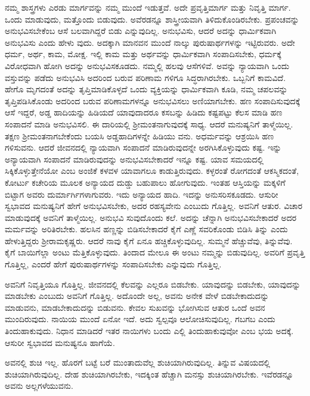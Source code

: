 ನಮ್ಮ ಶಾಸ್ತ್ರಗಳು ಎರಡು ಮಾರ್ಗವನ್ನು ನಮ್ಮ ಮುಂದೆ ಇಡುತ್ತವೆ. ಅದೇ ಪ್ರವೃತ್ತಿಮಾರ್ಗ ಮತ್ತು ನಿವೃತ್ತಿ ಮಾರ್ಗ. ಒಂದು ಮಾಡುವುದು, ಮತ್ತೊಂದು ಬಿಡುವುದು. ಅವೆರಡನ್ನೂ ಶಾಸ್ತ್ರೀಯವಾಗಿ ತಿಳಿದುಕೊಂಡಿರಬೇಕು. ಪ್ರಪಂಚವನ್ನು ಅನುಭವಿಸಬೇಕೆಂಬ ಆಸೆ ಬಲವಾಗಿದ್ದರೆ ಬಿಡು ಎನ್ನುವುದಿಲ್ಲ. ಅನುಭವಿಸು, ಆದರೆ ಅದನ್ನು ಧಾರ್ಮಿಕವಾಗಿ ಅನುಭವಿಸು ಎಂದು ಹೇಳು ವುದು. ಅದಕ್ಕಾಗಿ ಮಾನವನ ಮುಂದೆ ನಾಲ್ಕು ಪುರುಷಾರ್ಥಗಳನ್ನು ಇಟ್ಟಿರುವರು. ಅದೇ ಧರ್ಮ, ಅರ್ಥ, ಕಾಮ, ಮೋಕ್ಷ. ಇಲ್ಲಿ ಕಾಮ ಮತ್ತು ಅರ್ಥವನ್ನು ಧಾರ್ಮಿಕವಾಗಿ ಸಂಪಾದಿಸಬೇಕು, ಧರ್ಮಕ್ಕೆ ವಿರೋಧವಾಗಿ ಹೋಗಿ ಅದನ್ನು ಅನುಭವಿಸಕೂಡದು. ನಮ್ಮಲ್ಲಿ ಹಲವು ಆಸೆಗಳಿವೆ. ಅವನ್ನು ನ್ಯಾಯವಾಗಿ ಒಂದು ವಸ್ತುವನ್ನು ಪಡೆದು ಅನುಭವಿಸಿ ಅದರಿಂದ ಬರುವ ಪರಿಣಾಮ ಗಳಿಗೂ ಸಿದ್ಧರಾಗಿರಬೇಕು. ಒಬ್ಬನಿಗೆ ಕಾಮವಿದೆ. ಹೇಗೊ ಮೃಗದಂತೆ ಅದನ್ನು ತೃಪ್ತಿಮಾಡಿಕೊಳ್ಳದೆ ಒಂದು ವ್ಯಕ್ತಿಯನ್ನು ಧಾರ್ಮಿಕವಾಗಿ ಕೂಡಿ, ನಮ್ಮ ಚಪಲವನ್ನು ತೃಪ್ತಿಪಡಿಸಿಕೊಂಡು ಅದರಿಂದ ಬರುವ ಪರಿಣಾಮಗಳನ್ನೂ ಅನುಭವಿಸಲು ಅಣಿಯಾಗಬೇಕು. ಹಣ ಸಂಪಾದಿಸುವುದಕ್ಕೆ ಆಸೆ ಇದ್ದರೆ, ಅಡ್ಡ ಹಾದಿಯನ್ನು ಹಿಡಿಯದೆ ಯಾವುದಾದರೂ ಕಸಬನ್ನು ಹಿಡಿದು ಕಷ್ಟಪಟ್ಟು ಕೆಲಸ ಮಾಡಿ ಹಣ ಸಂಪಾದನೆ ಮಾಡಿ ಅನುಭವಿಸಲಿ. ಈ ದಾರಿಯಲ್ಲಿ ಶ‍್ರೀಮಂತನಾಗುವುದಕ್ಕೆ ಸಾಧ್ಯ. ಆದರೆ ಮನುಷ್ಯನಿಗೆ ತಾಳ್ಮೆಯಿಲ್ಲ. ತಕ್ಷಣ ಶ‍್ರೀಮಂತನಾಗಬೇಕೆಂದು ಬಯಸಿ ಅಡ್ಡಹಾದಿಗಳನ್ನೇ ಹಿಡಿಯು ವನು. ಅಧರ್ಮವನ್ನು ಆಶ್ರಯಿಸಿ ಹಣ ಗಳಿಸುವನು. ಆದರೆ ಜೀವನದಲ್ಲಿ ನ್ಯಾಯವಾಗಿ ಸಂಪಾದನೆ ಮಾಡಿರುವುದನ್ನೇ ಅರಗಿಸಿಕೊಳ್ಳುವುದು ಕಷ್ಟ. ಇನ್ನು ಅನ್ಯಾಯವಾಗಿ ಸಂಪಾದನೆ ಮಾಡಿರುವುದನ್ನು ಅನುಭವಿಸಬೇಕಾದರೆ ಇನ್ನೂ ಕಷ್ಟ. ಯಾವ ಸಮಯದಲ್ಲಿ ಸಿಕ್ಕಿಕೊಳ್ಳುತ್ತೇನೆಯೋ ಎಂಬ ಅಂಜಿಕೆ ಕಳವಳ ಯಾವಾಗಲೂ ಕಾಡುತ್ತಿರುವುದು. ಕಳ್ಳರಂತೆ ರೋಗದಂತೆ ಆಕಸ್ಮಿಕದಂತೆ, ಕೋರ್ಟು ಕಚೇರಿಯ ಮೂಲಕ ಅನ್ಯಾಯದ ದುಡ್ಡು ಬಹುಪಾಲು ಹೋಗುವುದು. ಇಂತಹ ಆಸ್ತಿಯನ್ನು ಮಕ್ಕಳಿಗೆ ಬಿಟ್ಟಾಗ ಅವರು ದುರ್ಮಾರ್ಗಿಗಳಾಗುವರು. ಇದು ಅನ್ಯಾಯದ ಹಾದಿ. ಇದನ್ನು ಅನುಸರಿಸಕೂಡದು. ಆಸುರೀ ಸ್ವಭಾವದ ಮನುಷ್ಯನಿಗೆ ಹೇಗೆ ಅನುಭವಿಸಬೇಕು, ಅದರ ರಹಸ್ಯವೇನು ಎಂಬುದು ಗೊತ್ತಿಲ್ಲ. ಅವನಿಗೆ ಆತುರ. ವಿಚಾರ ಮಾಡುವುದಕ್ಕೆ ಅವನಿಗೆ ತಾಳ್ಮೆಯಿಲ್ಲ. ಅನುಭವಿ ಸುವುದೊಂದು ಕಲೆ. ಅದನ್ನು ಚೆನ್ನಾಗಿ ಅನುಭವಿಸಬೇಕಾದರೆ ಅದರ ಮರ್ಮವನ್ನು ಅರಿತಿರಬೇಕು. ಹಲಸಿನ ಹಣ್ಣನ್ನು ಬಿಡಿಸಬೇಕಾದರೆ ಕೈಗೆ ಎಣ್ಣೆ ಸವರಿಕೊಂಡು ಬಿಡಿಸಿ ತಿನ್ನು ಎಂದು ಹೇಳುತ್ತಿದ್ದರು ಶ‍್ರೀರಾಮಕೃಷ್ಣರು. ಆದರೆ ನಾವು ಕೈಗೆ ಏನೂ ಹಚ್ಚಿಕೊಳ್ಳುವುದಿಲ್ಲ. ಸುಮ್ಮನೆ ಹೆಚ್ಚುವೆವು, ತಿನ್ನುವೆವು. ಕೈಗೆ ಬಾಯಿಗೆಲ್ಲಾ ಅಂಟು ಮೆತ್ತಿಕೊಳ್ಳುವುದು. ತಿಂದಾದ ಮೇಲೂ ಈ ಅಂಟು ನಮ್ಮನ್ನು ಬಿಡುವುದಿಲ್ಲ. ಅವರಿಗೆ ಪ್ರವೃತ್ತಿ ಗೊತ್ತಿಲ್ಲ, ಎಂದರೆ ಹೇಗೆ ಪುರುಷಾರ್ಥಗಳನ್ನು ಸಂಪಾದಿಸಬೇಕು ಎನ್ನುವುದು ಗೊತ್ತಿಲ್ಲ.

ಅವನಿಗೆ ನಿವೃತ್ತಿಯೂ ಗೊತ್ತಿಲ್ಲ. ಜೀವನದಲ್ಲಿ ಕೆಲವನ್ನು ಎಲ್ಲರೂ ಬಿಡಬೇಕು. ಯಾವುದನ್ನು ಬಿಡಬೇಕು, ಯಾವುದನ್ನು ಮಾಡಬೇಕು ಎಂಬುದು ಅವನಿಗೆ ಗೊತ್ತಿಲ್ಲ. ಅದೊಂದೇ ಅಲ್ಲ, ಅವನು ಅನೇಕ ವೇಳೆ ಬಿಡಬೇಕಾದುದನ್ನು ಮಾಡುವನು, ಮಾಡಬೇಕಾದುದನ್ನು ಬಿಡುವನು. ಕೇವಲ ಸುಖವನ್ನು ಭೋಗಿಸುವ ಆತುರ ಒಂದೆ ಅವನ ಮುಂದಿರುವುದು. ನಾಯಿಯ ಮುಂದೆ ಏನೋ ಇದೆ. ಅದು ಸ್ವಲ್ಪವೂ ಆಲೋಚಿಸುವುದಿಲ್ಲ. ಗಬಗಬ ಎಂದು ತಿಂದುಹಾಕುವುದು. ನಿಧಾನ ಮಾಡಿದರೆ ಇತರ ನಾಯಿಗಳು ಬಂದು ಎಲ್ಲಿ ತಿಂದುಹಾಕುವುವೋ ಎಂಬ ಭಯ ಅದಕ್ಕೆ. ಆಸುರೀ ಸ್ವಭಾವದ ಮನುಷ್ಯನೂ ಹಾಗೆಯೆ.

ಅವನಲ್ಲಿ ಶುಚಿ ಇಲ್ಲ. ಹೊರಗೆ ಬಟ್ಟೆ ಬರೆ ಮುಂತಾದುವೆಲ್ಲ ಶುಚಿಯಾಗಿರುವುದಿಲ್ಲ. ತಿನ್ನುವ ವಿಷಯದಲ್ಲಿ ಶುಚಿಯಾಗಿರುವುದಿಲ್ಲ. ದೇಹ ಶುಚಿಯಾಗಿರಬೇಕು, ಇದಕ್ಕಿಂತ ಹೆಚ್ಚಾಗಿ ಮನಸ್ಸು ಶುಚಿಯಾಗಿರಬೇಕು. ಇವೆರಡನ್ನೂ ಅವನು ಅಲ್ಲಗಳೆಯುವನು.

